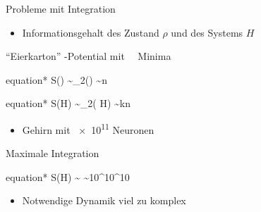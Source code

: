 \begin{frame}{Probleme mit Integration}
	\begin{itemize}
		\item{Informationsgehalt des Zustand $\rho$ und des Systems $H$}
	\end{itemize}
		\begin{beamerboxesrounded}{\enquote{Eierkarton} -Potential mit $\textcolor{white}{k}$ Minima}
			\begin{empheq}{equation*}
			S(\rho) \sim \log_{2}() \sim n
			\end{empheq}
			\vspace{-0.5cm}
			\begin{empheq}{equation*}
			S(H) \sim \log_{2}( H) \sim kn
			\end{empheq}
			\vspace{-0.5cm}
			\end{beamerboxesrounded}
	\begin{itemize}
		\item{Gehirn mit \num{e11} Neuronen}
	\end{itemize}
				\begin{beamerboxesrounded}{Maximale Integration}
					\begin{empheq}{equation*}
					S(H) \sim {} \sim 10^{10^{10}} 
					\end{empheq}
					\vspace{-0.5cm}
				\end{beamerboxesrounded}
		\begin{itemize}
			\item{Notwendige Dynamik viel zu komplex}
		\end{itemize}
\end{frame}